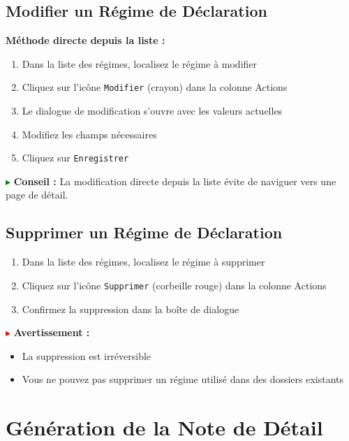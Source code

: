 \documentclass[12pt,a4paper]{report}
\begin{document}
\subsection{Modifier un Régime de Déclaration}

\textbf{Méthode directe depuis la liste :}

\begin{enumerate}[leftmargin=*]
    \item Dans la liste des régimes, localisez le régime à modifier
    \item Cliquez sur l'icône \texttt{Modifier} (crayon) dans la colonne Actions
    \item Le dialogue de modification s'ouvre avec les valeurs actuelles
    \item Modifiez les champs nécessaires
    \item Cliquez sur \texttt{Enregistrer}
\end{enumerate}

\textcolor{green}{$\blacktriangleright$} \textbf{Conseil :} La modification directe depuis la liste évite de naviguer vers une page de détail.

\subsection{Supprimer un Régime de Déclaration}

\begin{enumerate}[leftmargin=*]
    \item Dans la liste des régimes, localisez le régime à supprimer
    \item Cliquez sur l'icône \texttt{Supprimer} (corbeille rouge) dans la colonne Actions
    \item Confirmez la suppression dans la boîte de dialogue
\end{enumerate}

\textcolor{red}{$\blacktriangleright$} \textbf{Avertissement :} 
\begin{itemize}[leftmargin=*]
    \item La suppression est irréversible
    \item Vous ne pouvez pas supprimer un régime utilisé dans des dossiers existants
\end{itemize}

\section{Génération de la Note de Détail}
\end{document}
